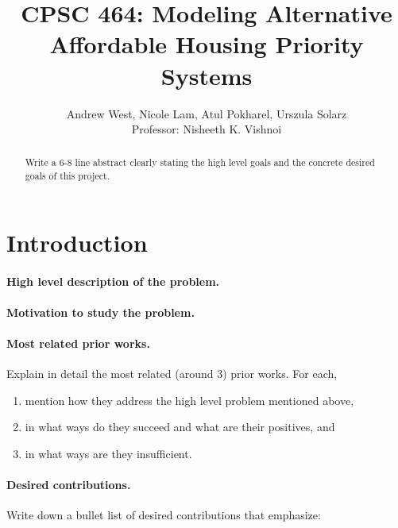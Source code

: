 \documentclass[11pt]{article}
\title{\bf CPSC 464: Modeling Alternative Affordable Housing Priority Systems}
\author{Andrew West, Nicole Lam, Atul Pokharel, Urszula Solarz \\
Professor: Nisheeth K. Vishnoi
}
\begin{document}
\maketitle
 
\begin{abstract}

Write a 6-8 line abstract clearly stating the high level goals and the concrete desired goals of this project. 
  
\end{abstract}


\newpage



\tableofcontents

\newpage

\section{Introduction}

\paragraph{High level description of the problem.}

\paragraph{Motivation to study the problem.}

\paragraph{Most related prior works.}
Explain in detail the most related (around 3) prior works. For each, 

\begin{enumerate}
\item  mention how they address the high level problem mentioned above,

\item in what ways do they succeed and what are their positives, and

\item in what ways are they insufficient.

\end{enumerate}




\paragraph{Desired contributions.}
Write down a bullet list of desired contributions that emphasize:
\end{document}
